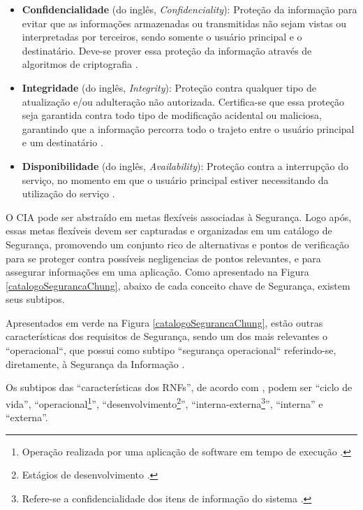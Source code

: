 \begin{itemize}
	\item \textbf{Confidencialidade} (do inglês, \textit{Confidenciality}): Proteção da informação para evitar que as informações armazenadas ou transmitidas não sejam vistas ou interpretadas por terceiros, sendo somente o usuário principal e o destinatário. Deve-se prover essa proteção da informação através de algoritmos de criptografia \cite{chung2012non} \cite{silva2007arquitetura}. 
	
	\item \textbf{Integridade} (do inglês, \textit{Integrity}): Proteção contra qualquer tipo de atualização e/ou adulteração não autorizada. Certifica-se que essa proteção seja garantida contra todo tipo de modificação acidental ou maliciosa, garantindo que a informação percorra todo o trajeto entre o usuário principal e um destinatário \cite{chung2012non} \cite{silva2007arquitetura}. 
	
	\item \textbf{Disponibilidade} (do inglês, \textit{Availability}): Proteção contra a interrupção do serviço, no momento em que o usuário principal estiver necessitando da utilização do serviço \cite{chung2012non} \cite{silva2007arquitetura}.
	  
\end{itemize}


O CIA pode ser abstraído em metas flexíveis associadas à Segurança. Logo após, essas metas flexíveis devem ser capturadas e organizadas em um catálogo de Segurança, promovendo um conjunto rico de alternativas e pontos de verificação para se proteger contra possíveis negligencias de pontos relevantes, e para assegurar informações em uma aplicação. Como apresentado na Figura \ref{catalogoSegurancaChung}, abaixo de cada conceito chave de Segurança, existem seus subtipos. 

Apresentados em  verde na Figura \ref{catalogoSegurancaChung}, estão outras características dos requisitos de Segurança, sendo um dos mais relevantes o ``operacional``, que possui como subtipo ``segurança operacional`` referindo-se, diretamente, à Segurança da Informação \cite{chung2012non}.


Os subtipos das “características dos RNFs”, de acordo com \cite{chung2012non}, podem ser “ciclo de vida”, “operacional\footnote[1]{Operação realizada por uma aplicação de software em tempo de execução \cite{chung2012non}.}”, “desenvolvimento\footnote[2]{Estágios de desenvolvimento \cite{chung2012non}.}”, “interna-externa\footnote[3]{Refere-se a confidencialidade dos itens de informação do sistema \cite{chung2012non}.}”, “interna” e “externa”.

